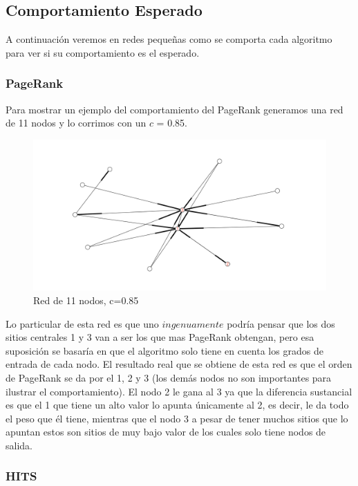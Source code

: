 \subsection{Comportamiento Esperado}

A continuación veremos en redes pequeñas como se comporta cada algoritmo para ver si su comportamiento es el esperado.

\subsubsection{PageRank}
Para mostrar un ejemplo del comportamiento del PageRank generamos una red de 11 nodos y lo corrimos con un $c$ = 0.85.

 \begin{figure}[!htb]
\begin{center}
    \includegraphics[scale=0.5]{imagenes/test5.png}
    \caption{Red de 11 nodos, c=0.85}
    \end{center}
\end{figure}

Lo particular de esta red es que uno $ingenuamente$ podría pensar que los dos sitios centrales 1 y 3 van a ser los que mas PageRank obtengan, pero esa suposición se basaría en que el algoritmo solo tiene en cuenta los grados de entrada de cada nodo. 
El resultado real que se obtiene de esta red es que el orden de PageRank se da por el 1, 2 y 3 (los demás nodos no son importantes para ilustrar el comportamiento). El nodo 2 le gana al 3 ya que la diferencia sustancial es que el 1 que tiene un alto valor lo apunta únicamente al 2, es decir, le da todo el peso que él tiene, mientras que el nodo 3 a pesar de tener muchos sitios que lo apuntan estos son sitios de muy bajo valor de los cuales solo tiene nodos de salida.

\subsubsection{HITS}


